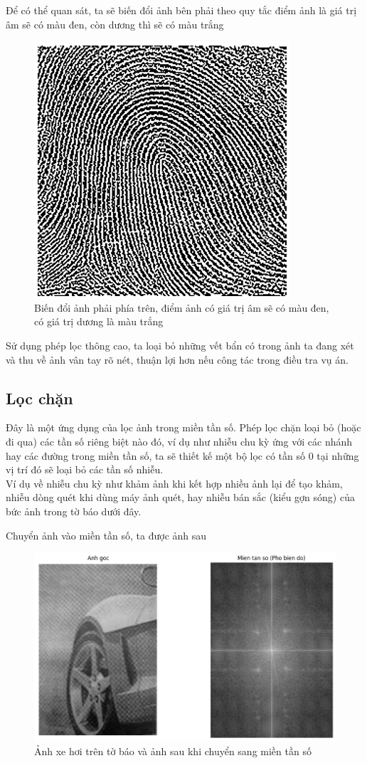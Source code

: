 \documentclass[12pt,a4paper]{report}
\numberwithin{equation}{section}
\theoremstyle{definition} %
\begin{document}
Để có thể quan sát, ta sẽ biến đổi ảnh bên phải theo quy tắc điểm ảnh là giá trị âm sẽ có màu đen, còn dương thì sẽ có màu trắng

\begin{figure}[H]
	\centering
	\includegraphics[width=0.68\linewidth]{img/ungdungsacanh/vantay1.png}
	\caption{Biến đổi ảnh phải phía trên, điểm ảnh có giá trị âm sẽ có màu đen, có giá trị dương là màu trắng}
	\label{fig141}
\end{figure}

Sử dụng phép lọc thông cao, ta loại bỏ những vết bẩn có trong ảnh ta đang xét và thu về ảnh vân tay rõ nét, thuận lợi hơn nếu công tác trong điều tra vụ án.
\subsection{Lọc chặn}
Đây là một ứng dụng của lọc ảnh trong miền tần số. Phép lọc chặn loại bỏ (hoặc đi qua) các tần số riêng biệt nào đó, ví dụ như nhiễu chu kỳ ứng với các nhánh hay các đường trong miền tần số, ta sẽ thiết kế một bộ lọc có tần số 0 tại những vị trí đó sẽ loại bỏ các tần số nhiễu.\\

Ví dụ về nhiễu chu kỳ như khảm ảnh khi kết hợp nhiều ảnh lại để tạo khảm, nhiễu dòng quét khi dùng máy ảnh quét, hay nhiễu bán sắc (kiểu gợn sóng) của bức ảnh trong tờ báo dưới đây.

Chuyển ảnh vào miền tần số, ta được ảnh sau
\begin{figure}[H]
\centering
\includegraphics[width=0.86\linewidth]{img/locChan/XehoiSaulocchan.png}
\caption{Ảnh xe hơi trên tờ báo và ảnh sau khi chuyển sang miền tần số}
\label{fig142}
\end{figure}
\end{document}
